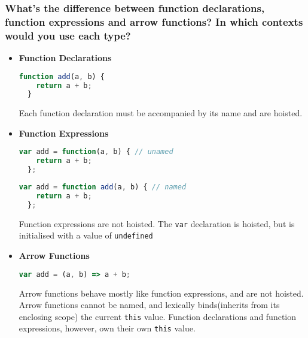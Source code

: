 \documentclass[12pt, a4paper]{article}
\newcommand{\code}[1]{\texttt{#1}}
\begin{document}
\subsubsection*{What's the difference between function declarations, function expressions and arrow functions? In which contexts would you use each type?}
\begin{itemize}
  \item \textbf{Function Declarations}
  \begin{mdframed}[backgroundcolor=light-gray, roundcorner=10pt,leftmargin=1, rightmargin=1, innerleftmargin=20, innertopmargin=5,innerbottommargin=5, outerlinewidth=1, linecolor=light-gray]
  \begin{lstlisting}[language=JavaScript]
  function add(a, b) {
    return a + b;
  }
  \end{lstlisting}
  \end{mdframed}
  Each function declaration must be accompanied by its name and are hoisted.
  \item \textbf{Function Expressions}
  \begin{mdframed}[backgroundcolor=light-gray, roundcorner=10pt,leftmargin=1, rightmargin=1, innerleftmargin=20, innertopmargin=5,innerbottommargin=5, outerlinewidth=1, linecolor=light-gray]
  \begin{lstlisting}[language=JavaScript]
  var add = function(a, b) { // unamed
    return a + b;
  };
  \end{lstlisting}
  \end{mdframed}
  \begin{mdframed}[backgroundcolor=light-gray, roundcorner=10pt,leftmargin=1, rightmargin=1, innerleftmargin=20, innertopmargin=5,innerbottommargin=5, outerlinewidth=1, linecolor=light-gray]
  \begin{lstlisting}[language=JavaScript]
  var add = function add(a, b) { // named
    return a + b;
  };
  \end{lstlisting}
  \end{mdframed}
  Function expressions are not hoisted. 
  The \code{var} declaration is hoisted, but is initialised with a value of \code{undefined}
  \item \textbf{Arrow Functions}
  \begin{mdframed}[backgroundcolor=light-gray, roundcorner=10pt,leftmargin=1, rightmargin=1, innerleftmargin=20, innertopmargin=5,innerbottommargin=5, outerlinewidth=1, linecolor=light-gray]
  \begin{lstlisting}[language=JavaScript]
  var add = (a, b) => a + b;
  \end{lstlisting}
  \end{mdframed}
  Arrow functions behave mostly like function expressions, and are not hoisted.
  Arrow functions cannot be named, and lexically binds(inherits from its enclosing scope) the current \code{this} value.
  Function declarations and function expressions, however, own their own \code{this} value.
\end{itemize}
\end{document}
